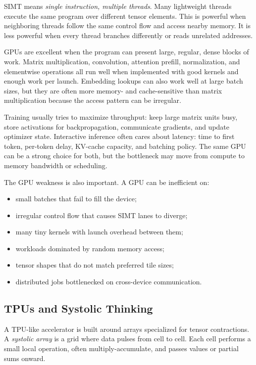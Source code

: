 SIMT means \emph{single instruction, multiple threads}. Many lightweight threads execute the same program over different tensor elements. This is powerful when neighboring threads follow the same control flow and access nearby memory. It is less powerful when every thread branches differently or reads unrelated addresses.

GPUs are excellent when the program can present large, regular, dense blocks of work. Matrix multiplication, convolution, attention prefill, normalization, and elementwise operations all run well when implemented with good kernels and enough work per launch. Embedding lookups can also work well at large batch sizes, but they are often more memory- and cache-sensitive than matrix multiplication because the access pattern can be irregular.

\begin{aside}
Training usually tries to maximize throughput: keep large matrix units busy, store activations for backpropagation, communicate gradients, and update optimizer state. Interactive inference often cares about latency: time to first token, per-token delay, KV-cache capacity, and batching policy. The same GPU can be a strong choice for both, but the bottleneck may move from compute to memory bandwidth or scheduling.
\end{aside}

The GPU weakness is also important. A GPU can be inefficient on:

\begin{itemize}[leftmargin=*]
  \item small batches that fail to fill the device;
  \item irregular control flow that causes SIMT lanes to diverge;
  \item many tiny kernels with launch overhead between them;
  \item workloads dominated by random memory access;
  \item tensor shapes that do not match preferred tile sizes;
  \item distributed jobs bottlenecked on cross-device communication.
\end{itemize}

\subsection{TPUs and Systolic Thinking}

A TPU-like accelerator is built around arrays specialized for tensor contractions. A \emph{systolic array} is a grid where data pulses from cell to cell. Each cell performs a small local operation, often multiply-accumulate, and passes values or partial sums onward.

